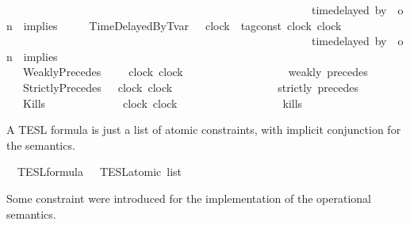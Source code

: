 \begin{isabellebody}
\ \ \ \ \ \ \ \ \ \ \ \ \ \ \ \ \ \ \ \ \ \ \ \ \ \ \ \ \ \ \ \ \ \ \ \ \ \ \ \ \ \ \ \ \ \ \ \ \ \ \ \ \ \ {\isacharparenleft}{\isacartoucheopen}{\isacharunderscore}\ time{\isacharminus}delayed\ by\ {\isacharunderscore}\ on\ {\isacharunderscore}\ implies\ {\isacharunderscore}{\isacartoucheclose}\ {}{}{\isacharparenright}\isanewline
\ \ {\isacharbar}\ TimeDelayedByTvar\ \ \ {\isacartoucheopen}clock{\isacartoucheclose}\ {\isacartoucheopen}{\isacharprime}{\isasymtau}\ tag{\isacharunderscore}const{\isacartoucheclose}\ {\isacartoucheopen}clock{\isacartoucheclose}\ {\isacartoucheopen}clock{\isacartoucheclose}\ \isanewline
\ \ \ \ \ \ \ \ \ \ \ \ \ \ \ \ \ \ \ \ \ \ \ \ \ \ \ \ \ \ \ \ \ \ \ \ \ \ \ \ \ \ \ \ \ \ \ \ \ \ \ \ \ \ {\isacharparenleft}{\isacartoucheopen}{\isacharunderscore}\ time{\isacharminus}delayed{\isasymsharp}\ by\ {\isacharunderscore}\ on\ {\isacharunderscore}\ implies\ {\isacharunderscore}{\isacartoucheclose}\ {}{}{\isacharparenright}\isanewline
\ \ {\isacharbar}\ WeaklyPrecedes\ \ \ \ \ {\isacartoucheopen}clock{\isacartoucheclose}\ {\isacartoucheopen}clock{\isacartoucheclose}\ \ \ \ \ \ \ \ \ \ \ \ \ \ \ \ \ \ {\isacharparenleft}\ {\isacartoucheopen}weakly\ precedes{\isacartoucheclose}\ {}{}{\isacharparenright}\isanewline
\ \ {\isacharbar}\ StrictlyPrecedes\ \ \ {\isacartoucheopen}clock{\isacartoucheclose}\ {\isacartoucheopen}clock{\isacartoucheclose}\ \ \ \ \ \ \ \ \ \ \ \ \ \ \ \ \ \ {\isacharparenleft}\ {\isacartoucheopen}strictly\ precedes{\isacartoucheclose}\ {}{}{\isacharparenright}\isanewline
\ \ {\isacharbar}\ Kills\ \ \ \ \ \ \ \ \ \ \ \ \ \ {\isacartoucheopen}clock{\isacartoucheclose}\ {\isacartoucheopen}clock{\isacartoucheclose}\ \ \ \ \ \ \ \ \ \ \ \ \ \ \ \ \ \ {\isacharparenleft}\ {\isacartoucheopen}kills{\isacartoucheclose}\ {}{}{\isacharparenright}%
\begin{isamarkuptext}%
A TESL formula is just a list of atomic constraints, with implicit conjunction
  for the semantics.%
\end{isamarkuptext}\isamarkuptrue%
\isamarkupfalse%
\ {\isacharprime}{\isasymtau}\ TESL{\isacharunderscore}formula\ {\isacharequal}\ {\isacartoucheopen}{\isacharprime}{\isasymtau}\ TESL{\isacharunderscore}atomic\ list{\isacartoucheclose}%
\begin{isamarkuptext}%
Some constraint were introduced for the implementation of the operational semantics.

\end{isamarkuptext}
\end{isabellebody}
